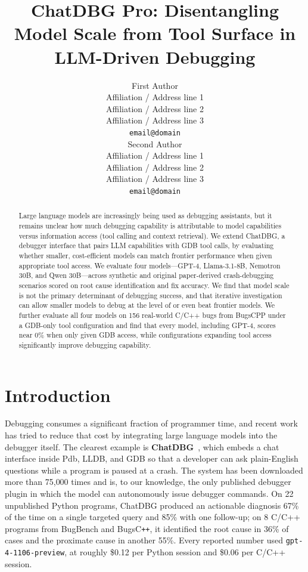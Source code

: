 \documentclass[11pt]{article}
\title{ChatDBG Pro: Disentangling Model Scale from Tool Surface in LLM-Driven Debugging}
\author{First Author \\
  Affiliation / Address line 1 \\
  Affiliation / Address line 2 \\
  Affiliation / Address line 3 \\
  \texttt{email@domain} \\\And
  Second Author \\
  Affiliation / Address line 1 \\
  Affiliation / Address line 2 \\
  Affiliation / Address line 3 \\
  \texttt{email@domain} \\}
\begin{document}
\maketitle

\begin{abstract}
Large language models are increasingly being used as debugging assistants, but it remains unclear how much debugging capability is attributable to model capabilities versus information access (tool calling and context retrieval). We extend ChatDBG, a debugger interface that pairs LLM capabilities with GDB tool calls, by evaluating whether smaller, cost-efficient models can match frontier performance when given appropriate tool access. We evaluate four models---GPT-4, Llama-3.1-8B, Nemotron 30B, and Qwen 30B---across synthetic and original paper-derived crash-debugging scenarios scored on root cause identification and fix accuracy. We find that model scale is not the primary determinant of debugging success, and that iterative investigation can allow smaller models to debug at the level of or even beat frontier models. We further evaluate all four models on 156 real-world C/C++ bugs from BugsCPP under a GDB-only tool configuration and find that every model, including GPT-4, scores near 0\% when only given GDB access, while configurations expanding tool access significantly improve debugging capability.
\end{abstract}

\section{Introduction}
\label{sec:intro}

Debugging consumes a significant fraction of programmer time, and recent work has tried to reduce that cost by integrating large language models into the debugger itself. The clearest example is \textbf{ChatDBG}~\cite{levin2024chatdbg}, which embeds a chat interface inside Pdb, LLDB, and GDB so that a developer can ask plain-English questions while a program is paused at a crash. The system has been downloaded more than 75{,}000 times and is, to our knowledge, the only published debugger plugin in which the model can autonomously issue debugger commands. On 22 unpublished Python programs, ChatDBG produced an actionable diagnosis 67\% of the time on a single targeted query and 85\% with one follow-up; on 8 C/C++ programs from BugBench and BugsC\texttt{++}, it identified the root cause in 36\% of cases and the proximate cause in another 55\%. Every reported number used \texttt{gpt-4-1106-preview}, at roughly \$0.12 per Python session and \$0.06 per C/C++ session.
\end{document}
